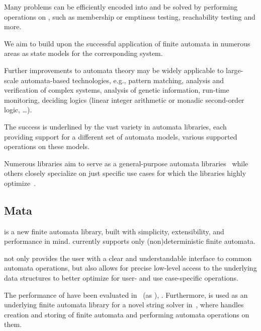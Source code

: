 Many problems can be efficiently encoded into \nfas and be solved by performing operations on \nfas, such as membership or emptiness testing, reachability testing and more.

We aim to build upon the successful application of finite automata in numerous areas as state models for the corresponding system.

Further improvements to automata theory may be widely applicable to large-scale automata-based technologies, e.g., pattern matching, analysis and verification of complex systems, analysis of genetic information, run-time monitoring, deciding logics (linear integer arithmetic or monadic second-order logic, \ldots).

The success is underlined by the vast variety in automata libraries, each providing support for a different set of automata models, various supported operations on these models.

Numerous libraries aim to serve as a general-purpose automata libraries~\cite{automatanet, tacas24_mata_10.1007/978-3-031-57249-4_7,fado} while others closely specialize on just specific use cases for which the libraries highly optimize~\cite{mona,automatajar}.

\subsection{Mata}

\mata is a new finite automata library, built with simplicity, extensibility, and performance in mind.
\mata currently supports only (non)deterministic finite automata.

\mata not only provides the user with a clear and understandable interface to common automata operations, but also allows for precise low-level access to the underlying data structures to better optimize for user- and use case-specific operations.

The performance of \mata have been evaluated in~\cite{cade23_reasoning_regular_properties_comparision_DBLP:conf/cade/FiedorHHRSV23} (as \enfa), \cite{tacas24_mata_10.1007/978-3-031-57249-4_7}.
Furthermore, \mata is used as an underlying finite automata library for a novel string solver \noodler in~\cite{fm23fm23_equations_synergy_regular_constraints_DBLP:conf/fm/BlahoudekCCHHLS23, oopsla23_stabilization_DBLP:journals/pacmpl/ChenCHHLS23,tacas24_noodler_10.1007/978-3-031-57246-3_2}, where \mata handles creation and storing of finite automata and performing automata operations on them.

